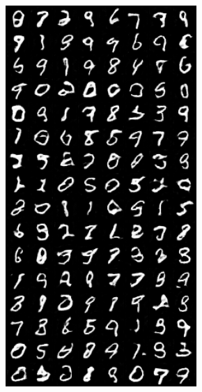 \begin{figure}[H]
\begin{subfigure}{0.2\textwidth}
        \caption{}
        \label{subfig:init/fake_sample_epoch_0005}
    \end{subfigure}%
    \begin{subfigure}{0.2\textwidth}
        \centering
        \includegraphics[width=0.95\linewidth]{init/fake_sample_epoch_0010.png}
        \caption{}
        \label{subfig:init/fake_sample_epoch_0010}

\end{subfigure}
\end{figure}
